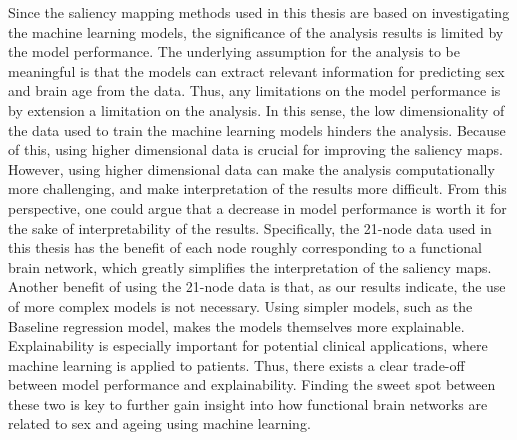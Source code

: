 Since the saliency mapping methods used in this thesis are based on investigating the machine learning models, the significance of the analysis results is limited by the model performance. The underlying assumption for the analysis to be meaningful is that the models can extract relevant information for predicting sex and brain age from the data. Thus, any limitations on the model performance is by extension a limitation on the analysis. In this sense, the low dimensionality of the data used to train the machine learning models hinders the analysis. Because of this, using higher dimensional data is crucial for improving the saliency maps. However, using higher dimensional data can make the analysis computationally more challenging, and make interpretation of the results more difficult. From this perspective, one could argue that a decrease in model performance is worth it for the sake of interpretability of the results. Specifically, the 21-node data used in this thesis has the benefit of each node roughly corresponding to a functional brain network, which greatly simplifies the interpretation of the saliency maps. Another benefit of using the 21-node data is that, as our results indicate, the use of more complex models is not necessary. Using simpler models, such as the Baseline regression model, makes the models themselves more explainable. Explainability is especially important for potential clinical applications, where machine learning is applied to patients. Thus, there exists a clear trade-off between model performance and explainability. Finding the sweet spot between these two is key to further gain insight into how functional brain networks are related to sex and ageing using machine learning. 

